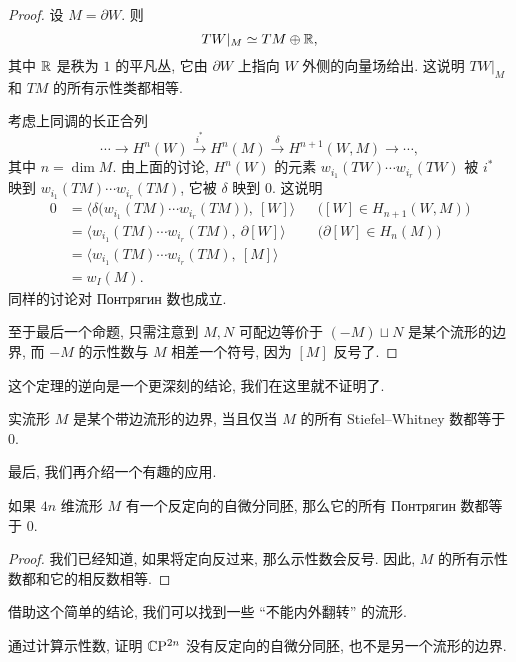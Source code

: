 \begin{proof}
    \allowdisplaybreaks
    设 $M = \partial W$. 则
    \[ TW |_M \simeq TM \oplus \mathbb{R}, \]
    其中 $\mathbb{R}$ 是秩为 $1$ 的平凡丛,
    它由 $\partial W$ 上指向 $W$ 外侧的向量场给出.
    这说明 $TW |_M$ 和 $TM$ 的所有示性类都相等.

    考虑上同调的长正合列
    \[ \cdots \to H^n (W) 
        \overset{i^*}{\longrightarrow} H^n (M) 
        \overset{\delta}{\longrightarrow} H^{n+1} (W, M) \to \cdots , \]
    其中 $n = \dim M$. 由上面的讨论, $H^n (W)$ 的元素
    $w_{i_1} (TW) \cdots w_{i_r} (TW)$ 被 $i^*$ 映到
    $w_{i_1} (TM) \cdots w_{i_r} (TM)$, 它被 $\delta$ 映到 $0$. 这说明
    \begin{align*}
        0 &= \bigl\langle \delta \bigl( w_{i_1} (TM) \cdots w_{i_r} (TM) \bigr) ,\ [W] \bigr\rangle
            && \bigl( [W] \in H_{n+1} (W, M) \bigr) \\
        &= \bigl\langle w_{i_1} (TM) \cdots w_{i_r} (TM) ,\ \partial [W] \bigr\rangle
            && \bigl( \partial [W] \in H_n (M) \bigr) \\
        &= \bigl\langle w_{i_1} (TM) \cdots w_{i_r} (TM) ,\ [M] \bigr\rangle \\
        &= w_I (M).
    \end{align*}
    同样的讨论对 Понтрягин 数也成立.

    至于最后一个命题, 只需注意到 $M, N$ 可配边等价于 $(-M) \sqcup N$ 是某个流形的边界,
    而 $-M$ 的示性数与 $M$ 相差一个符号, 因为 $[M]$ 反号了.
\end{proof}

这个定理的逆向是一个更深刻的结论,
我们在这里就不证明了.

\begin{theorem}
    实流形 $M$ 是某个带边流形的边界,
    当且仅当 $M$ 的所有 Stiefel--Whitney 数都等于 $0$.
\end{theorem}

最后, 我们再介绍一个有趣的应用.

\begin{proposition}
    如果 $4n$ 维流形 $M$ 有一个反定向的自微分同胚,
    那么它的所有 Понтрягин 数都等于 $0$.
\end{proposition}

\begin{proof}
    我们已经知道, 如果将定向反过来, 那么示性数会反号.
    因此, $M$ 的所有示性数都和它的相反数相等.
\end{proof}

借助这个简单的结论, 我们可以找到一些 ``不能内外翻转'' 的流形.

\begin{exercise}
    通过计算示性数, 证明 $\mathbb{C} \mathrm{P}^{2n}$ 没有反定向的自微分同胚,
    也不是另一个流形的边界.
\end{exercise}

